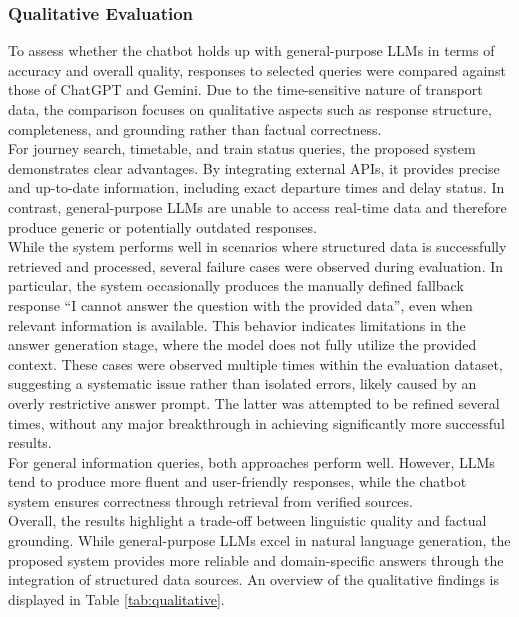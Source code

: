 \documentclass[fleqn,moreauthors,10pt]{ds_report}
\begin{document}
\subsubsection*{Qualitative Evaluation}
To assess whether the chatbot holds up with general-purpose LLMs in terms of accuracy and overall quality, responses to selected queries were compared against those of ChatGPT and Gemini. Due to the time-sensitive nature of transport data, the comparison focuses on qualitative aspects such as response structure, completeness, and grounding rather than factual correctness. \\
For journey search, timetable, and train status queries, the proposed system demonstrates clear advantages. By integrating external APIs, it provides precise and up-to-date information, including exact departure times and delay status. In contrast, general-purpose LLMs are unable to access real-time data and therefore produce generic or potentially outdated responses. \\
While the system performs well in scenarios where structured data is successfully retrieved and processed, several failure cases were observed during evaluation. In particular, the system occasionally produces the manually defined fallback response “I cannot answer the question with the provided data”, even when relevant information is available. This behavior indicates limitations in the answer generation stage, where the model does not fully utilize the provided context. These cases were observed multiple times within the evaluation dataset, suggesting a systematic issue rather than isolated errors, likely caused by an overly restrictive answer prompt. The latter was attempted to be refined several times, without any major breakthrough in achieving significantly more successful results. \\
For general information queries, both approaches perform well. However, LLMs tend to produce more fluent and user-friendly responses, while the chatbot system ensures correctness through retrieval from verified sources. \\
Overall, the results highlight a trade-off between linguistic quality and factual grounding. While general-purpose LLMs excel in natural language generation, the proposed system provides more reliable and domain-specific answers through the integration of structured data sources. An overview of the qualitative findings is displayed in Table \ref{tab:qualitative}.
\end{document}
